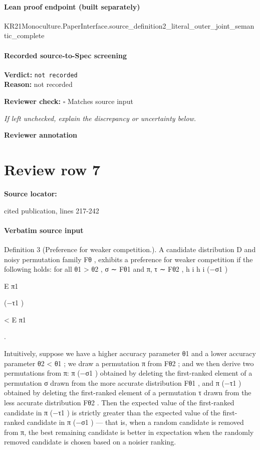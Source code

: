 \documentclass[10pt]{article}
\newcommand{\reviewerbox}{%
  \par\noindent\fbox{\parbox{0.96\linewidth}{\rule{0pt}{0.38in}}}\par
}
\newcommand{\reviewmatch}[1]{%
  \par\noindent\textbf{Reviewer check:} $\square$\; #1\par
  \noindent\emph{If left unchecked, explain the discrepancy or uncertainty below.}\par
}
\begin{document}
\paragraph{Lean proof endpoint (built separately)}\begin{ReviewVerbatim}
KR21Monoculture.PaperInterface.source_definition2_literal_outer_joint_semantic_complete
\end{ReviewVerbatim}

\paragraph{Recorded source-to-Spec screening}
\textbf{Verdict:} \texttt{not recorded}
\\
\textbf{Reason:} not recorded
\reviewmatch{Matches source input}
\noindent\textbf{Reviewer annotation}\par
\reviewerbox
\clearpage
\hypertarget{source-claim-faa08c37fc761736}{}
\section*{Review row 7}
\textbf{Source locator:} {\footnotesize\raggedright cited publication, lines 217-\allowbreak{}242\par}
\paragraph{Verbatim source input}
\begin{ReviewVerbatim}
Definition 3 (Preference for weaker competition.). A candidate distribution D and noisy permutation family
Fθ , exhibits a preference for weaker competition if the following holds: for all θ1 > θ2 , σ ∼ Fθ1 and
π, τ ∼ Fθ2 ,
h
i
h
i
(−{σ1 })

E π1

(−{τ1 })

< E π1

.

Intuitively, suppose we have a higher accuracy parameter θ1 and a lower accuracy parameter θ2 < θ1 ; we
draw a permutation π from Fθ2 ; and we then derive two permutations from π: π (−{σ1 }) obtained by deleting
the first-ranked element of a permutation σ drawn from the more accurate distribution Fθ1 , and π (−{τ1 })
obtained by deleting the first-ranked element of a permutation τ drawn from the less accurate distribution
Fθ2 .
Then the expected value of the first-ranked candidate in π (−{τ1 }) is strictly greater than the expected
value of the first-ranked candidate in π (−{σ1 }) — that is, when a random candidate is removed from π, the
best remaining candidate is better in expectation when the randomly removed candidate is chosen based on
a noisier ranking.
\end{ReviewVerbatim}
\end{document}
